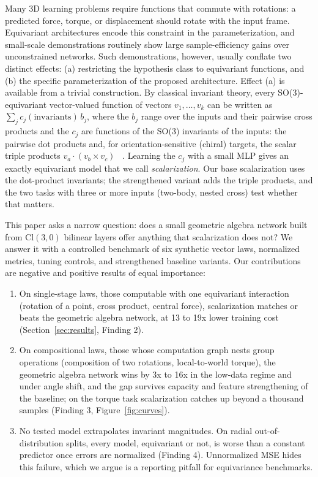 \documentclass[11pt]{article}
\begin{document}
Many 3D learning problems require functions that commute with rotations: a
predicted force, torque, or displacement should rotate with the input frame.
Equivariant architectures encode this constraint in the parameterization, and
small-scale demonstrations routinely show large sample-efficiency gains over
unconstrained networks. Such demonstrations, however, usually conflate two
distinct effects: (a) restricting the hypothesis class to equivariant
functions, and (b) the specific parameterization of the proposed architecture.
Effect (a) is available from a trivial construction. By classical invariant
theory, every SO(3)-equivariant vector-valued function of vectors
$v_1,\dots,v_k$ can be written as
$\sum_j c_j(\text{invariants})\, b_j$, where the $b_j$ range over the inputs
and their pairwise cross products and the $c_j$ are functions of the SO(3)
invariants of the inputs: the pairwise dot products and, for orientation-sensitive
(chiral) targets, the scalar triple products $v_a \cdot (v_b \times v_c)$
~\citep{villar2021scalars}. Learning the $c_j$ with a small MLP
gives an exactly equivariant model that we call \emph{scalarization}. Our base
scalarization uses the dot-product invariants; the strengthened variant adds the
triple products, and the two tasks with three or more inputs (two-body, nested
cross) test whether that matters.

This paper asks a narrow question: does a small geometric algebra network
built from $\mathrm{Cl}(3,0)$ bilinear layers offer anything that
scalarization does not? We answer it with a controlled benchmark of six
synthetic vector laws, normalized metrics, tuning controls, and strengthened
baseline variants. Our contributions are negative and positive results of
equal importance:

\begin{enumerate}
\item On single-stage laws, those computable with one equivariant
interaction (rotation of a point, cross product, central force),
scalarization matches or beats the geometric algebra network, at 13 to 19x
lower training cost (Section~\ref{sec:results}, Finding 2).
\item On compositional laws, those whose computation graph nests group
operations (composition of two rotations, local-to-world torque), the
geometric algebra network wins by 3x to 16x in the low-data regime and under
angle shift, and the gap survives capacity and feature strengthening of the
baseline; on the torque task scalarization catches up beyond a thousand
samples (Finding 3, Figure~\ref{fig:curves}).
\item No tested model extrapolates invariant magnitudes. On radial
out-of-distribution splits, every model, equivariant or not, is worse than a
constant predictor once errors are normalized (Finding 4). Unnormalized MSE
hides this failure, which we argue is a reporting pitfall for equivariance
benchmarks.
\end{enumerate}
\end{document}
